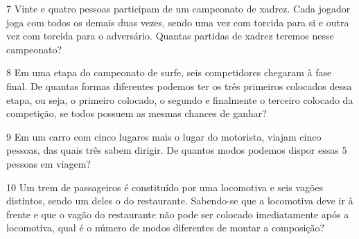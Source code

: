 \begin{mdframed}[linewidth=2pt,linecolor=salmao,roundcorner=2pt]
\vspace{2cm}
\end{mdframed}


\num{7} Vinte e quatro pessoas participam de um campeonato de xadrez. Cada jogador joga com todos os demais duas vezes, sendo uma vez com
torcida para si e outra vez com torcida para o adversário. Quantas partidas
de xadrez teremos nesse campeonato?

\begin{mdframed}[linewidth=2pt,linecolor=salmao,roundcorner=2pt]
\vspace{2cm}
\end{mdframed}

\num{8} Em uma etapa do campeonato de surfe, seis competidores chegaram à fase
final. De quantas formas diferentes podemos ter os três primeiros
colocados dessa etapa, ou seja, o primeiro colocado, o segundo e
finalmente o terceiro colocado da competição, se todos
possuem as mesmas chances de ganhar?

\begin{mdframed}[linewidth=2pt,linecolor=salmao,roundcorner=2pt]
\vspace{2cm}
\end{mdframed}

\num{9} Em um carro com cinco lugares mais o lugar do motorista, viajam cinco pessoas,
das quais três sabem dirigir. De quantos modos podemos dispor essas 5
pessoas em viagem?

\begin{mdframed}[linewidth=2pt,linecolor=salmao,roundcorner=2pt]
\vspace{2cm}
\end{mdframed}

\num{10} Um trem de passageiros é constituído por uma locomotiva e seis vagões
distintos, sendo um deles o do restaurante. Sabendo-se que a locomotiva deve ir
à frente e que o vagão do restaurante não pode ser colocado imediatamente
após a locomotiva, qual é o número de modos diferentes de montar a
composição?


